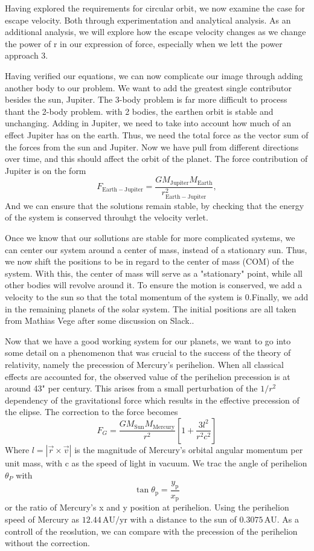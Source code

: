\documentclass[10pt, twocolumn]{revtex4-1}
\begin{document}
Having explored the requirements for circular orbit, we now examine the case for escape velocity. Both through experimentation and analytical analysis. 
As an additional analysis, we will explore how the escape velocity changes as we change the power of r in our expression of force, especially when we lett 
the power approach 3. 

Having verified our equations, we can now complicate our image through adding another body to our problem. We want to add the greatest single contributor
besides the sun, Jupiter. The 3-body problem is far more difficult to process thant the 2-body problem. with 2 bodies, the earthen orbit is stable and
unchanging. Adding in Jupiter, we need to take into account how much of an effect Jupiter has on the earth. Thus, we need the total force as the 
vector sum of the forces from the sun and Jupiter. Now we have pull from different directions over time, and this should affect the orbit of the planet.
The force contribution of Jupiter is on the form
\[
F_{\mathrm{Earth-Jupiter}}=\frac{GM_{\mathrm{Jupiter}}M_{\mathrm{Earth}}}{r_{\mathrm{Earth-Jupiter}}^2},
\]
And we can ensure that the solutions remain stable, by checking that the energy of the system is conserved throuhgt the velocity verlet. 

Once we know that our sollutions are stable for more complicated systems, we can center our system around a center of mass, instead of a stationary sun.
Thus, we now shift the positions to be in regard to the center of mass (COM) of the system. With this, the center of mass will serve as a "stationary" 
point, while all other bodies will revolve around it. To ensure the motion is conserved, we add a velocity to the sun so that the total momentum of the 
system is 0.Finally, we add in the remaining planets of the solar system. The initial positions are all taken from Mathias Vege after some discussion on
Slack.\cite{MathiasPlanetvalues}. 


Now that we have a good working system for our planets, we want to go into some detail on a phenomenon that was crucial to the success of the theory of
relativity, namely the precession of Mercury's perihelion. When all classical effects are accounted for, the observed value of the perihelion precession
is at around 43" per century. This arises from a small perturbation of the $1/r^2$ dependency of the gravitationsl force which results in the effective 
precession of the elipse. The correction to the force becomes 
\[
F_G = \frac{GM_\mathrm{Sun}M_\mathrm{Mercury}}{r^2}\left[1 + \frac{3l^2}{r^2c^2}\right]
\]
Where $l=|\vec{r}\times\vec{v}|$ is the magnitude of Mercury's orbital angular momentum per unit mass, with c as the speed of light in vacuum. We trac the
angle of perihelion $\theta_P$ with 
\[
\tan \theta_\mathrm{p} = \frac{y_\mathrm{p}}{x_\mathrm{p}}
\]
or the ratio of Mercury's x and y position at perihelion. Using the perihelion speed of Mercury as $12.44\,\mathrm{AU}/\mathrm{yr}$ with a distance to the 
sun of $0.3075\,\mathrm{AU}$. As a controll of the reoslution, we can compare with the precession of the perihelion without the correction. 
\end{document}
